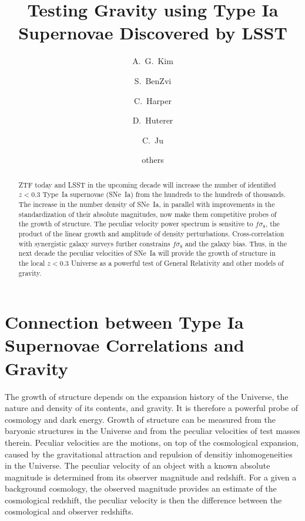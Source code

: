 \documentclass{aastex62}   	%
\begin{document}
\title{Testing Gravity using Type Ia Supernovae Discovered by LSST}
\author[0000-0001-6315-8743]{A.~G.~Kim}
\author{S.~BenZvi}
\author{C.~Harper}
\author{D.~Huterer}
\author{C.~Ju}

\author{others}


\begin{abstract}
ZTF today and LSST in the upcoming decade will increase the number of identified  $z<0.3$ Type~Ia supernovae (SNe~Ia)  from the hundreds to the
hundreds of thousands.  The increase in the number density of SNe~Ia, in parallel with improvements in the standardization of
their absolute magnitudes, now make them competitive probes of the growth of structure.  The peculiar velocity power spectrum
is sensitive to $f\sigma_8$,
the product of the linear growth and amplitude of density perturbations.  Cross-correlation with synergistic galaxy surveys further constrains $f \sigma_8$ and the galaxy bias. 
Thus, in the next decade the peculiar velocities of
SNe~Ia will provide the growth of structure  in the local $z<0.3$ Universe as a powerful test of General Relativity and other models of gravity.
\end{abstract}

\section{Connection between Type Ia Supernovae Correlations and Gravity}

The growth of structure depends on the expansion history of the Universe, the nature and density of its contents, and gravity. 
It is therefore a powerful probe of cosmology and dark energy.  Growth of structure can be measured from the baryonic structures
in the Universe and from the peculiar velocities of test masses therein.
Peculiar velocities are the motions, on top of the cosmological expansion, caused by the gravitational attraction
and repulsion of densitiy inhomogeneities in the Universe.  The peculiar velocity of an object with a known absolute magnitude
is determined from its observer magnitude and redshift. For a given a background cosmology, the observed magnitude provides
an estimate of the cosmological redshift, the peculiar velocity is then the difference between the cosmological and observer redshifts.
\end{document}
